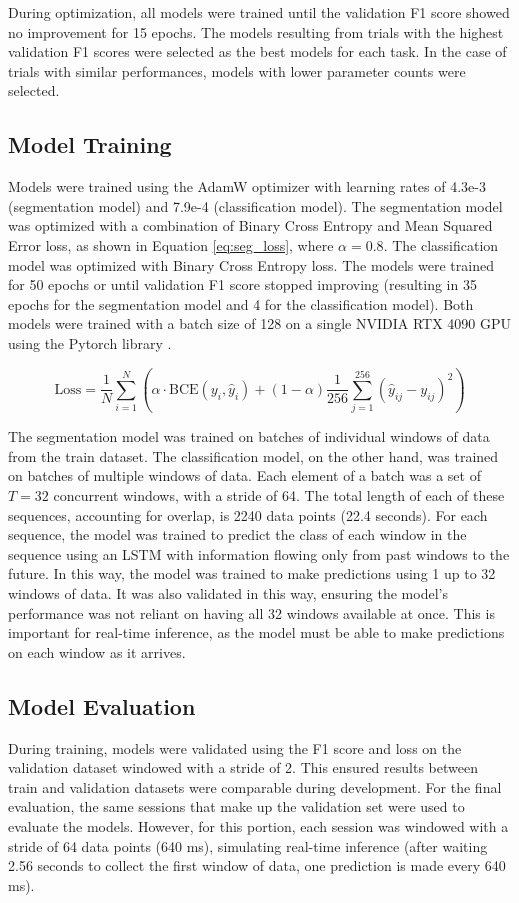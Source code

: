 \documentclass[conference]{IEEEtran}
\begin{document}
During optimization, all models were trained until the validation F1 score showed no improvement for 15 epochs. The models resulting from trials with the highest validation F1 scores were selected as the best models for each task. In the case of trials with similar performances, models with lower parameter counts were selected.

\subsection{Model Training}
Models were trained using the AdamW optimizer with learning rates of 4.3e-3 (segmentation model) and 7.9e-4 (classification model). The segmentation model was optimized with a combination of Binary Cross Entropy and Mean Squared Error loss, as shown in Equation \ref{eq:seg_loss}, where $\alpha=0.8$. The classification model was optimized with Binary Cross Entropy loss. The models were trained for 50 epochs or until validation F1 score stopped improving (resulting in 35 epochs for the segmentation model and 4 for the classification model). Both models were trained with a batch size of 128 on a single NVIDIA RTX 4090 GPU using the Pytorch library \cite{paszke_2019}. 

\begin{equation}
    \text{Loss} = \frac{1}{N} \sum_{i=1}^{N} \left( \alpha\cdot\text{BCE}(y_i, \hat y_i) + (1-\alpha)\frac{1}{256} \sum_{j=1}^{256} (\hat y_{ij} - y_{ij})^2 \right)
    \label{eq:seg_loss}
\end{equation}


The segmentation model was trained on batches of individual windows of data from the train dataset. The classification model, on the other hand, was trained on batches of multiple windows of data. Each element of a batch was a set of $T=32$ concurrent windows, with a stride of 64. The total length of each of these sequences, accounting for overlap, is 2240 data points (22.4 seconds). For each sequence, the model was trained to predict the class of each window in the sequence using an LSTM with information flowing only from past windows to the future. In this way, the model was trained to make predictions using 1 up to 32 windows of data. It was also validated in this way, ensuring the model's performance was not reliant on having all 32 windows available at once. This is important for real-time inference, as the model must be able to make predictions on each window as it arrives.

\subsection{Model Evaluation}\label{sec:model_evaluation}
During training, models were validated using the F1 score and loss on the validation dataset windowed with a stride of 2. This ensured results between train and validation datasets were comparable during development. For the final evaluation, the same sessions that make up the validation set were used to evaluate the models. However, for this portion, each session was windowed with a stride of 64 data points (640 ms), simulating real-time inference (after waiting 2.56 seconds to collect the first window of data, one prediction is made every 640 ms). 
\end{document}
